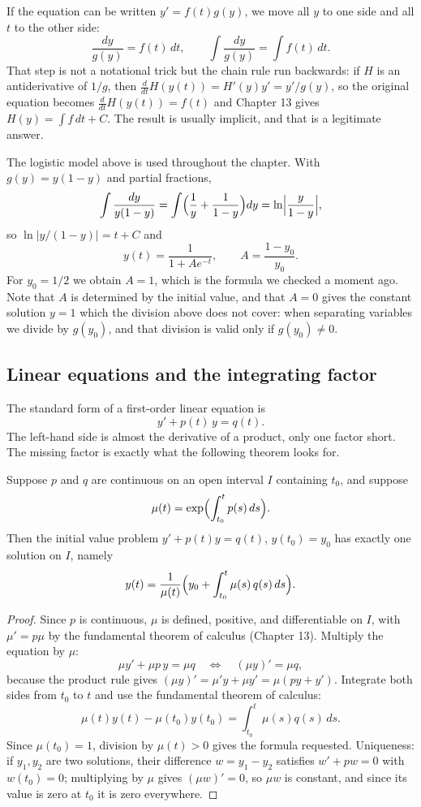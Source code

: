 If the equation can be written $y'=f(t)g(y)$, we move all $y$ to one side and all $t$ to the
other side:
\[
\frac{dy}{g(y)}=f(t)\,dt,\qquad \int\frac{dy}{g(y)}=\int f(t)\,dt .
\]
That step is not a notational trick but the chain rule run backwards: if $H$ is an
antiderivative of $1/g$, then $\frac{d}{dt}H(y(t))=H'(y)y'=y'/g(y)$, so the original
equation becomes $\frac{d}{dt}H(y(t))=f(t)$ and Chapter 13 gives $H(y)=\int f\,dt+C$. The
result is usually implicit, and that is a legitimate answer.

The logistic model above is used throughout the chapter. With $g(y)=y(1-y)$ and partial
fractions,
\[
\int\frac{dy}{y(1-y)}=\int\Bigl(\frac{1}{y}+\frac{1}{1-y}\Bigr)dy
=\ln\Bigl|\frac{y}{1-y}\Bigr| ,
\]
so $\ln|y/(1-y)|=t+C$ and
\[
y(t)=\frac{1}{1+Ae^{-t}},\qquad A=\frac{1-y_{0}}{y_{0}} .
\]
For $y_{0}=1/2$ we obtain $A=1$, which is the formula we checked a moment ago. Note that $A$
is determined by the initial value, and that $A=0$ gives the constant solution $y=1$ which
the division above does not cover: when separating variables we divide by $g(y_{0})$, and
that division is valid only if $g(y_{0})\ne0$.

\subsection{Linear equations and the integrating factor}

The standard form of a first-order linear equation is
\[
y'+p(t)\,y=q(t).
\]
The left-hand side is almost the derivative of a product, only one factor short. The missing
factor is exactly what the following theorem looks for.

\begin{teorema}
Suppose $p$ and $q$ are continuous on an open interval $I$ containing $t_{0}$, and suppose
\[
\mu(t)=\exp\Bigl(\int_{t_{0}}^{t}p(s)\,ds\Bigr).
\]
Then the initial value problem $y'+p(t)y=q(t)$, $y(t_{0})=y_{0}$ has exactly one solution on
$I$, namely
\[
y(t)=\frac{1}{\mu(t)}\Bigl(y_{0}+\int_{t_{0}}^{t}\mu(s)\,q(s)\,ds\Bigr).
\]
\end{teorema}

\begin{proof}
Since $p$ is continuous, $\mu$ is defined, positive, and differentiable on $I$, with
$\mu'=p\mu$ by the fundamental theorem of calculus (Chapter 13). Multiply the equation by
$\mu$:
\[
\mu y'+\mu p\,y=\mu q
\quad\Longleftrightarrow\quad
(\mu y)'=\mu q ,
\]
because the product rule gives $(\mu y)'=\mu'y+\mu y'=\mu(py+y')$. Integrate both sides from
$t_{0}$ to $t$ and use the fundamental theorem of calculus:
\[
\mu(t)y(t)-\mu(t_{0})y(t_{0})=\int_{t_{0}}^{t}\mu(s)q(s)\,ds .
\]
Since $\mu(t_{0})=1$, division by $\mu(t)>0$ gives the formula requested. Uniqueness: if
$y_{1},y_{2}$ are two solutions, their difference $w=y_{1}-y_{2}$ satisfies $w'+pw=0$ with
$w(t_{0})=0$; multiplying by $\mu$ gives $(\mu w)'=0$, so $\mu w$ is constant, and since its
value is zero at $t_{0}$ it is zero everywhere.
\end{proof}

